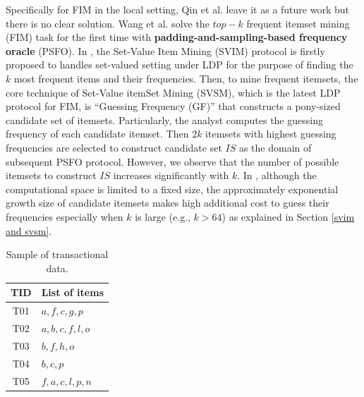 \documentclass[conference]{IEEEtran}
\begin{document}
Specifically for FIM in the local setting, Qin et al.\cite{a1} leave it as a future work but there is no clear solution. Wang et al.\cite{a2} solve the $top-k$ frequent itemset mining (FIM) task for the first time with \textbf{padding-and-sampling-based frequency oracle} (PSFO). In \cite{a2}, the Set-Value Item Mining (SVIM) protocol is firstly proposed to handles set-valued setting under LDP for the purpose of finding the $k$ most frequent items and their frequencies. Then, to mine frequent itemsets, the core technique of Set-Value itemSet Mining (SVSM), which is the latest LDP protocol for FIM, is ``Guessing Frequency (GF)'' that constructs a pony-sized candidate set of itemsets. Particularly, the analyst computes the guessing frequency of each candidate itemset. Then $2k$ itemsets with highest guessing frequencies are selected to construct candidate set $IS$ as the domain of subsequent PSFO protocol. However, we observe that the number of possible itemsets to construct $IS$ increases significantly with $k$. In \cite{a2}, although the computational space is limited to a fixed size, the approximately exponential growth size of candidate itemsets makes high additional cost to guess their frequencies especially when $k$ is large (e.g., $k > 64$) as explained in Section \ref{svim and svsm}.

\begin{table}[tb]
\caption{{\color{red}Sample of transactional data.}}
\label{trans table}
\centering
\begin{tabular}{|c|l|}\hline
  TID&List of items \\\hline
  T01&$a,f,c,g,p$ \\\hline
  T02&$a,b,c,f,l,o$ \\\hline
  T03&$b,f,h,o$ \\\hline
  T04&$b,c,p$ \\\hline
  T05&$f,a,c,l,p,n$ \\\hline
\end{tabular}
\end{table}
\end{document}
